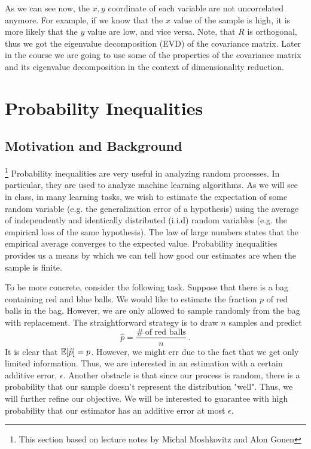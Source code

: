 As we can see now, the $x,y$ coordinate of each variable are not uncorrelated anymore. For example, if we know that the $x$ value of the sample is high, it is more likely that the $y$ value are low, and vice versa. Note, that $R$ is orthogonal, thus we got the eigenvalue decomposition (EVD) of the covariance matrix. Later in the course we are going to use some of the properties of the covariance matrix and its eigenvalue decomposition in the context of dimensionality reduction. 


\section{Probability Inequalities}
\subsection{Motivation and Background}
\footnote{This section based on lecture notes by Michal Moshkovitz and Alon Gonen} Probability inequalities are very useful in analyzing random processes. In particular, they are used to analyze machine learning algorithms. As we will see in class, in many learning tasks, we wish to estimate the expectation of some random variable
(e.g. the generalization error of a hypothesis) using the average of independently and identically distributed (i.i.d) random variables (e.g. the empirical loss of the same hypothesis). The law of large numbers states that the empirical average converges to the expected value. Probability inequalities provides us a means by which we can tell how good our estimates are when the sample is finite.

To be more concrete, consider the following task. Suppose that there is a bag containing red and blue balls. We would like to estimate the fraction $p$ of red balls in the bag. However, we are only
allowed to sample randomly from the bag with replacement. The straightforward strategy is to draw $n$ samples and predict
\[
\hat{p} = \frac{\# ~\text{of red balls}}{n}~.
\]
It is clear that $\mathbb{E} [\hat{p}] = p$. However, we might err due to the
fact that we get only limited information. Thus, we are
interested in an estimation with a certain additive error, 
$\epsilon$. Another obstacle is that since our process is random,
there is a probability that our sample doesn't represent the
distribution "well". Thus, we will further refine our objective. We will
be interested to guarantee with high probability that our estimator
has an additive error at most $\epsilon$.


